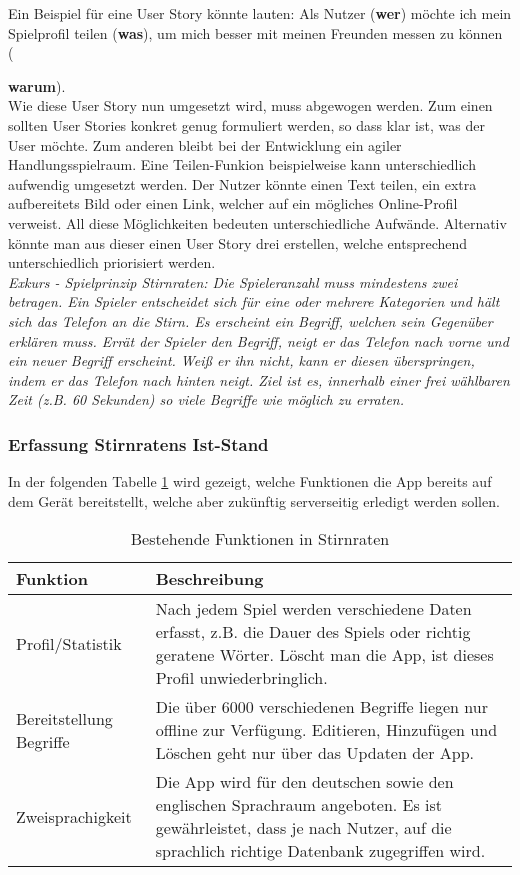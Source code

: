 Ein Beispiel für eine User Story könnte lauten: Als Nutzer (\textbf{wer}) möchte ich mein Spielprofil teilen (\textbf{was}), um mich besser mit meinen Freunden messen zu können ({\textbf{warum}).\\
	
Wie diese User Story nun umgesetzt wird, muss abgewogen werden. Zum einen sollten User Stories konkret genug formuliert werden, so dass klar ist, was der User möchte. Zum anderen bleibt bei der Entwicklung ein agiler Handlungsspielraum.\cite{UserStoryMapping} Eine Teilen-Funkion beispielweise kann unterschiedlich aufwendig umgesetzt werden. Der Nutzer könnte einen Text teilen, ein extra aufbereitets Bild oder einen Link, welcher auf ein mögliches Online-Profil verweist. All diese Möglichkeiten bedeuten unterschiedliche Aufwände. Alternativ könnte man aus dieser einen User Story drei erstellen, welche entsprechend unterschiedlich priorisiert werden.\\

\textit{Exkurs - Spielprinzip Stirnraten: Die Spieleranzahl muss mindestens zwei betragen. Ein Spieler entscheidet sich für eine oder mehrere Kategorien und hält sich das Telefon an die Stirn. Es erscheint ein Begriff, welchen sein Gegenüber erklären muss. Errät der Spieler den Begriff, neigt er das Telefon nach vorne und ein neuer Begriff erscheint. Weiß er ihn nicht, kann er diesen überspringen, indem er das Telefon nach hinten neigt. Ziel ist es, innerhalb einer frei wählbaren Zeit (z.B. 60 Sekunden) so viele Begriffe wie möglich zu erraten.}

\subsubsection{Erfassung Stirnratens Ist-Stand}

In der folgenden Tabelle \ref{tab:bestehende_funktionen} wird gezeigt, welche Funktionen die App bereits auf dem Gerät bereitstellt, welche aber zukünftig serverseitig erledigt werden sollen. 

\begin{table}[H]
	\begin{center}
		\begin{tabular}{|p{3cm}|p{10cm}|}
			Funktion & Beschreibung \\ \hline
			Profil/Statistik & Nach jedem Spiel werden verschiedene Daten erfasst, z.B. die Dauer des Spiels oder richtig geratene Wörter. Löscht man die App, ist dieses Profil unwiederbringlich. \\ \hline
			Bereitstellung Begriffe & Die über 6000 verschiedenen Begriffe liegen nur offline zur Verfügung. Editieren, Hinzufügen und Löschen geht nur über das Updaten der App.\\ \hline
			Zweisprachigkeit & Die App wird für den deutschen sowie den englischen Sprachraum angeboten. Es ist gewährleistet, dass je nach Nutzer, auf die sprachlich richtige Datenbank zugegriffen wird.\\ \hline
		\end{tabular}
	\end{center}
	\caption[Bestehende Funktionen in Stirnraten]{Bestehende Funktionen in Stirnraten}
	\label{tab:bestehende_funktionen} 
\end{table}

}
